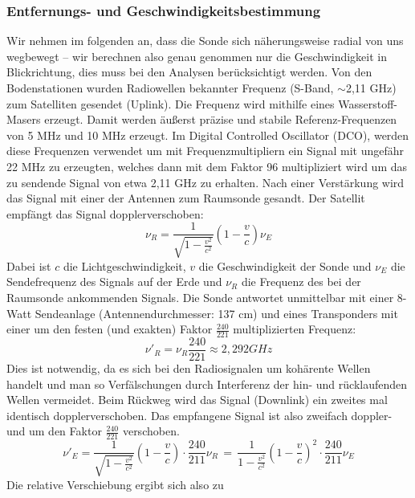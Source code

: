 \subsubsection{Entfernungs- und Geschwindigkeitsbestimmung }
Wir nehmen im folgenden an, dass die Sonde sich näherungsweise radial von uns wegbewegt – wir berechnen also genau genommen nur die Geschwindigkeit in Blickrichtung, dies muss bei den Analysen berücksichtigt werden.
Von den Bodenstationen wurden Radiowellen bekannter Frequenz (S-Band, $\sim$2,11 GHz) zum Satelliten gesendet (Uplink).
Die Frequenz wird mithilfe eines Wasserstoff-Masers erzeugt.
Damit werden äußerst präzise und stabile Referenz-Frequenzen von 5 MHz und 10 MHz erzeugt. Im Digital Controlled Oscillator (DCO), werden diese Frequenzen verwendet um mit Frequenzmultipliern ein Signal mit ungefähr 22 MHz zu erzeugten, welches dann mit dem Faktor 96 multipliziert wird um das zu sendende Signal von etwa 2,11 GHz zu erhalten. Nach einer Verstärkung wird das Signal mit einer der Antennen zum Raumsonde gesandt.\cite{Anderson2002}
Der Satellit empfängt das Signal dopplerverschoben:
\begin{equation}
\label{equ:doppler1}
 \nu_R = \frac{1}{\sqrt{1-\frac{v^2}{c^2}}}(1-\frac{v}{c})\nu_E
\end{equation}
Dabei ist $c$ die Lichtgeschwindigkeit, $v$ die Geschwindigkeit der Sonde und $\nu_E$ die Sendefrequenz des Signals auf der Erde und  $\nu_R$ die Frequenz des bei der Raumsonde ankommenden Signals.
Die Sonde antwortet unmittelbar mit einer 8-Watt Sendeanlage (Antennendurchmesser: 137 cm\cite{Markwardt2002}) und eines Transponders
mit einer um den festen (und exakten) Faktor $ \frac{240}{221} $ multiplizierten Frequenz:
\begin{equation}
\label{equ:Faktor}
\nu'_R = \nu_R\frac{240}{221} \approx 2,292 GHz
\end{equation}
Dies ist notwendig, da es sich bei den Radiosignalen um kohärente Wellen handelt und man so Verfälschungen durch Interferenz der hin- und rücklaufenden Wellen vermeidet\cite{Anderson2002}.
Beim Rückweg wird das Signal (Downlink) ein zweites mal identisch dopplerverschoben.
Das empfangene Signal ist also zweifach doppler- und um den Faktor $\frac{240}{221}$ verschoben.
\begin{equation}
 \nu'_E = \frac{1}{\sqrt{1-\frac{v^2}{c^2}}}(1-\frac{v}{c}) \cdot \frac{240}{211}\nu_R \, = \,
\frac{1}{1-\frac{v^2}{c^2}}(1-\frac{v}{c})^2 \cdot \frac{240}{211} \nu_E
\end{equation}
Die relative Verschiebung ergibt sich also zu
